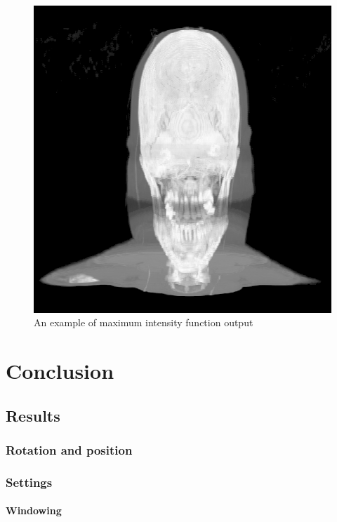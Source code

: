 \documentclass[twoside, english, 11pt]{report}
\begin{document}
\begin{figure}[!h]
\centerline{\includegraphics[scale = 0.6]{img/maxi}}
\caption{An example of maximum intensity function output\label{fig:maxi}}
\end{figure}





\chapter{Conclusion}
\section{Results}
\subsection{Rotation and position}
\subsection{Settings}
\subsubsection{Windowing}
\end{document}
